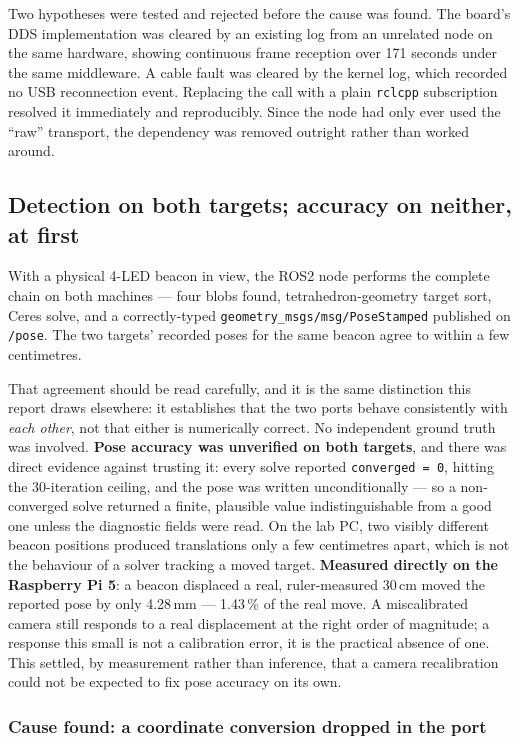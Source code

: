 \documentclass[11pt]{article}
\begin{document}
Two hypotheses were tested and rejected before the cause was found. The
board's DDS implementation was cleared by an existing log from an unrelated
node on the same hardware, showing continuous frame reception over 171
seconds under the same middleware. A cable fault was cleared by the kernel
log, which recorded no USB reconnection event. Replacing the call with a
plain \texttt{rclcpp} subscription resolved it immediately and
reproducibly. Since the node had only ever used the ``raw'' transport, the
dependency was removed outright rather than worked around.

\subsection{Detection on both targets; accuracy on neither, at first}

With a physical 4-LED beacon in view, the ROS2 node performs the complete
chain on both machines --- four blobs found, tetrahedron-geometry target
sort, Ceres solve, and a correctly-typed
\texttt{geometry\_msgs/msg/PoseStamped} published on \texttt{/pose}. The two
targets' recorded poses for the same beacon agree to within a few
centimetres.

That agreement should be read carefully, and it is the same distinction this
report draws elsewhere: it establishes that the two ports behave
consistently with \emph{each other}, not that either is numerically correct.
No independent ground truth was involved. \textbf{Pose accuracy was
unverified on both targets}, and there was direct evidence against trusting
it: every solve reported \texttt{converged = 0}, hitting the 30-iteration
ceiling, and the pose was written unconditionally --- so a non-converged
solve returned a finite, plausible value indistinguishable from a good one
unless the diagnostic fields were read. On the lab PC, two visibly different
beacon positions produced translations only a few centimetres apart, which
is not the behaviour of a solver tracking a moved target.
\textbf{Measured directly on the Raspberry Pi 5}: a beacon displaced a real,
ruler-measured 30\,cm moved the reported pose by only 4.28\,mm ---
1.43\,\% of the real move. A miscalibrated camera still responds to a real
displacement at the right order of magnitude; a response this small is not
a calibration error, it is the practical absence of one. This settled, by
measurement rather than inference, that a camera recalibration could not be
expected to fix pose accuracy on its own.

\subsubsection*{Cause found: a coordinate conversion dropped in the port}
\end{document}

